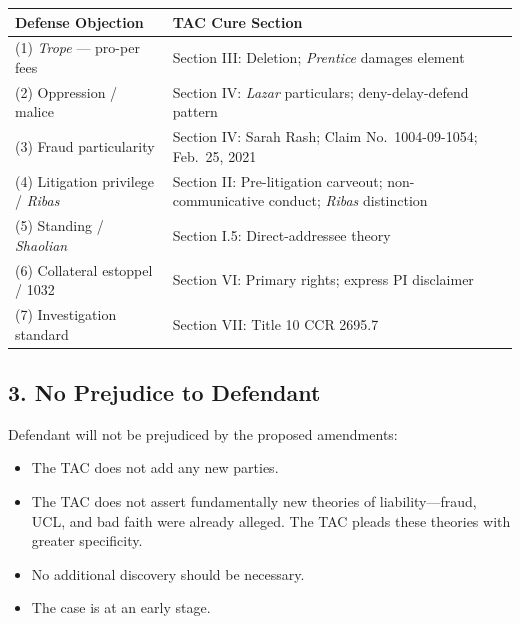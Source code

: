 {\def\LTcaptype{table} %
\begin{longtable}[]{@{}
  >{\raggedright\arraybackslash}p{}
  >{\raggedright\arraybackslash}p{}@{}}
\toprule\noalign{}
\begin{minipage}[b]{\linewidth}\raggedright
Defense Objection
\end{minipage} & \begin{minipage}[b]{\linewidth}\raggedright
TAC Cure Section
\end{minipage} \\
\midrule\noalign{}
\endhead
\bottomrule\noalign{}
\endlastfoot
(1) \emph{Trope} --- pro-per fees & Section III: Deletion; \emph{Prentice} damages element \\
(2) Oppression / malice & Section IV: \emph{Lazar} particulars; deny-delay-defend pattern \\
(3) Fraud particularity & Section IV: Sarah Rash; Claim No.~1004-09-1054; Feb.~25, 2021 \\
(4) Litigation privilege / \emph{Ribas} & Section II: Pre-litigation carveout; non-communicative conduct; \emph{Ribas} distinction \\
(5) Standing / \emph{Shaolian} & Section I.5: Direct-addressee theory \\
(6) Collateral estoppel / \textsection{} 1032 & Section VI: Primary rights; express PI disclaimer \\
(7) Investigation standard & Section VII: Title 10 CCR \textsection{} 2695.7 \\
\end{longtable}
}

\subsection{3. No Prejudice to Defendant}\label{no-prejudice-to-defendant}

Defendant will not be prejudiced by the proposed amendments:

\begin{itemize}
\tightlist
\item
  The TAC does not add any new parties.
\item
  The TAC does not assert fundamentally new theories of liability---fraud, UCL, and bad faith were already alleged. The TAC pleads these theories with greater specificity.
\item
  No additional discovery should be necessary.
\item
  The case is at an early stage.
\end{itemize}

